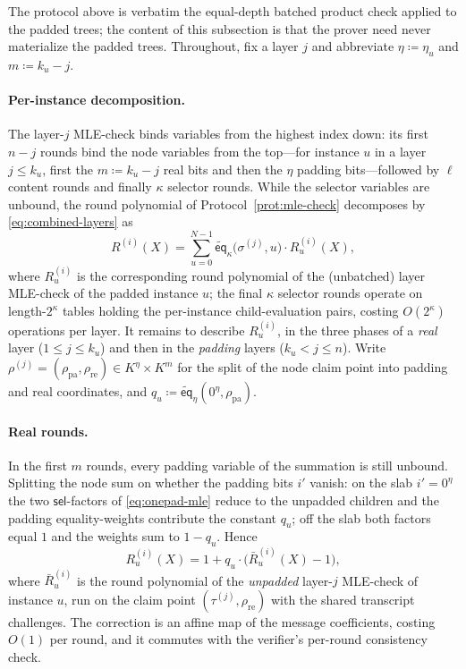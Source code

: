 \documentclass{article}
\theoremstyle{definition}
\newcommand*{\mle}{\widetilde}
\newcommand{\eq}{\mathsf{eq}}
\newcommand{\sel}{\textsf{sel}}
\begin{document}
The protocol above is verbatim the equal-depth batched product check applied to the padded trees; the content of this subsection is that the prover need never materialize the padded trees. Throughout, fix a layer $j$ and abbreviate $\eta \coloneqq \eta_u$ and $m \coloneqq k_u - j$.

\paragraph{Per-instance decomposition.}
The layer-$j$ MLE-check binds variables from the highest index down: its first $n - j$ rounds bind the node variables from the top---for instance $u$ in a layer $j \leq k_u$, first the $m \coloneqq k_u - j$ real bits and then the $\eta$ padding bits---followed by $\ell$ content rounds and finally $\kappa$ selector rounds. While the selector variables are unbound, the round polynomial of Protocol~\ref{prot:mle-check} decomposes by \eqref{eq:combined-layers} as
\[
  R^{(i)}(X) = \sum_{u = 0}^{N - 1} \mle{\eq}_\kappa\bigl( \sigma^{(j)}, u \bigr) \cdot R^{(i)}_u(X),
\]
where $R^{(i)}_u$ is the corresponding round polynomial of the (unbatched) layer MLE-check of the padded instance $u$; the final $\kappa$ selector rounds operate on length-$2^\kappa$ tables holding the per-instance child-evaluation pairs, costing $O(2^\kappa)$ operations per layer. It remains to describe $R^{(i)}_u$, in the three phases of a \emph{real} layer ($1 \leq j \leq k_u$) and then in the \emph{padding} layers ($k_u < j \leq n$). Write $\rho^{(j)} = (\rho_\text{pa}, \rho_\text{re}) \in K^\eta \times K^m$ for the split of the node claim point into padding and real coordinates, and $q_u \coloneqq \mle{\eq}_\eta(0^\eta, \rho_\text{pa})$.

\paragraph{Real rounds.}
In the first $m$ rounds, every padding variable of the summation is still unbound. Splitting the node sum on whether the padding bits $i'$ vanish: on the slab $i' = 0^\eta$ the two $\sel$-factors of \eqref{eq:onepad-mle} reduce to the unpadded children and the padding equality-weights contribute the constant $q_u$; off the slab both factors equal $1$ and the weights sum to $1 - q_u$. Hence
\[
  R^{(i)}_u(X) = 1 + q_u \cdot \bigl( \bar{R}^{(i)}_u(X) - 1 \bigr),
\]
where $\bar{R}^{(i)}_u$ is the round polynomial of the \emph{unpadded} layer-$j$ MLE-check of instance $u$, run on the claim point $(\tau^{(j)}, \rho_\text{re})$ with the shared transcript challenges. The correction is an affine map of the message coefficients, costing $O(1)$ per round, and it commutes with the verifier's per-round consistency check.
\end{document}
